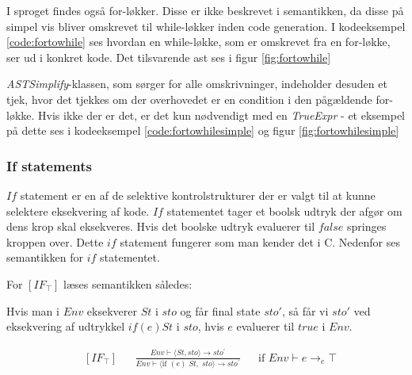 \noindent I sproget findes også for-løkker. Disse er ikke beskrevet i semantikken, da disse på simpel vis bliver omskrevet til while-løkker inden code generation. I kodeeksempel \ref{code:fortowhile} ses hvordan en while-løkke, som er omskrevet fra en for-løkke, ser ud i konkret kode. Det tilsvarende \gls{ast} ses i figur \ref{fig:fortowhile}



\noindent \textit{ASTSimplify}-klassen, som sørger for alle omskrivninger, indeholder desuden et tjek, hvor det tjekkes om der overhovedet er en condition i den pågældende for-løkke. Hvis ikke der er det, er det kun nødvendigt med en \textit{TrueExpr} - et eksempel på dette ses i kodeeksempel \ref{code:fortowhilesimple} og figur \ref{fig:fortowhilesimple}



\subsubsection*{If statements}
$If$ statement er en af de selektive kontrolstrukturer der er valgt til at kunne selektere eksekvering af kode. $If$ statementet tager et boolsk udtryk der afgør om dens krop skal eksekveres. Hvis det boolske udtryk evaluerer til $false$ springes kroppen over. Dette $if$ statement fungerer som man kender det i C. Nedenfor ses semantikken for $if$ statementet.

\noindent For $[IF_\top]$ læses semantikken således: 

Hvis man i $Env$ eksekverer $St$ i $sto$ og får final state $sto'$, så får vi $sto'$ ved eksekvering af udtrykkel $if(e)  St$ i $sto$, hvis $e$ evaluerer til $true$ i $Env$.

\begin{align*}
&[IF_\top] & &\frac{Env \vdash \langle St, sto \rangle \rightarrow sto^\prime}{Env \vdash \langle \text{if } (e)\; St,\; sto \rangle \rightarrow sto^\prime} & &\text{if } Env \vdash e \rightarrow_e \top\\\\
\end{align*}

